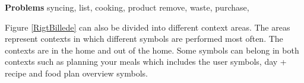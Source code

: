 \textbf{Problems}
syncing, list, cooking, product remove, waste, purchase, 

Figure \ref{RigtBillede} can also be divided into different context areas. The areas represent contexts in which different symbols are performed most often. The contexts are in the home and out of the home. Some symbols can belong in both contexts such as planning your meals which includes the user symbols, day + recipe and food plan overview symbols.       